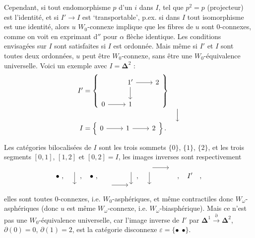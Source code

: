 \documentclass[11pt]{article}
\newcommand{\printedpage}[1]{\marginpar{\footnotesize p.~#1}}
\def\dcprintedpending{}
\newcommand{\msp}[1]{\marginpar{\footnotesize\raggedright
  \ifx\dcprintedpending\empty\else p.~\dcprintedpending\par\fi
  [#1]}\gdef\dcprintedpending{}}
\newcommand{\bDelta}{\boldsymbol{\Delta}}
\begin{document}
Cependant, si tout endomorphisme $p$ d'un $i$ dans $I$, tel que $p^2 = p$ (projecteur) est l'identité, et si \msp{page 57}$I' \longrightarrow I$ est `transportable', p.ex. si dans $I$ tout isomorphisme est une identité, alors $u$ $W_0$-connexe implique que les fibres de $u$ sont 0-connexes, comme on voit en exprimant d$''$ pour $\alpha$ flèche identique. Les conditions envisagées sur $I$ sont satisfaites si $I$ est ordonnée. Mais même si $I'$ et $I$ sont toutes deux ordonnées, $u$ peut être $W_0$-connexe, sans être une $W_0$-équivalence universelle. Voici un exemple avec $I = \bDelta^2$ :
\[
\begin{array}{r@{\;}l@{\quad}c}
I' = & \left\{\begin{tikzcd}[ampersand replacement=\&]
 \& 1' \arrow[r] \arrow[d] \& 2 \\
0 \arrow[r] \& 1 \&
\end{tikzcd}\right\} & \\[1ex]
 & & \Big\downarrow \\[1ex]
I = & \left\{\begin{tikzcd}[ampersand replacement=\&]
0 \arrow[r] \& 1 \arrow[r] \& 2
\end{tikzcd}\right\}. &
\end{array}
\]

\printedpage{36}
Les catégories bilocalisées de $I$ sont les trois sommets $\{0\}$, $\{1\}$, $\{2\}$, et les trois segments $[0,1]$, $[1,2]$ et $[0,2] = I$, les images inverses sont respectivement
\[
\bullet\ ,\quad
\begin{tikzcd}[row sep=normal] {} \arrow[d] \\ {} \end{tikzcd}\ ,\quad
\bullet\ ,\quad
\begin{tikzcd}[row sep=normal] & {} \arrow[d] \\ {} \arrow[r] & {} \end{tikzcd}\ ,\quad
\begin{tikzcd}[row sep=normal] {} \arrow[r] \arrow[d] & {} \\ {} & \end{tikzcd}\ ,\quad
I'\quad ,
\]
elles sont toutes 0-connexes, i.e. $W_0$-asphériques, et même contractiles donc $W_\omega$-asphériques (donc $u$ est même $W_\omega$-connexe, i.e. $W_\omega$-biasphérique). Mais ce n'est pas une $W_0$-équivalence universelle, car l'image inverse de $I'$ par $\bDelta^1 \xrightarrow{\partial} \bDelta^2$, $\partial(0) = 0$, $\partial(1) = 2$, \msp{page 58}est la catégorie disconnexe $\varepsilon = \{\bullet\ \ \bullet\}$.
\end{document}
